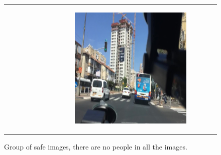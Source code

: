 \begin{figure}
\begin{tabular}{p{\horspace} p{\horspace} p{\horspace}}
\begin{subfigure}[b]{\subfigwidth}
    \end{subfigure} 
    \hfill &
    \begin{subfigure}[b]{\subfigwidth}
        \includegraphics[width=\subfigwidth]{images/gpt4/s6.jpg}
    \end{subfigure}
\end{tabular}
\caption[Group of safe images for common features' extraction.]
{Group of safe images, there are no people in all the images.}
\label{fig:safe_group}
\end{figure}
%

